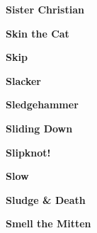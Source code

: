 \newline
\vspace{10pt} 
\begin{center}\textbf{Sister Christian}\end{center}
\newline
\vspace{10pt} 
\begin{center}\textbf{Skin the Cat}\end{center}
\newline
\vspace{10pt} 
\begin{center}\textbf{Skip}\end{center}
\newline
\vspace{10pt} 
\begin{center}\textbf{Slacker}\end{center}
\newline
\vspace{10pt} 
\begin{center}\textbf{Sledgehammer}\end{center}
\newline
\vspace{10pt} 
\begin{center}\textbf{Sliding Down}\end{center}
\newline
\vspace{10pt} 
\begin{center}\textbf{Slipknot!}\end{center}
\newline
\vspace{10pt} 
\begin{center}\textbf{Slow}\end{center}
\newline
\vspace{10pt} 
\begin{center}\textbf{Sludge \& Death}\end{center}
\newline
\vspace{10pt} 
\begin{center}\textbf{Smell the Mitten}\end{center}
